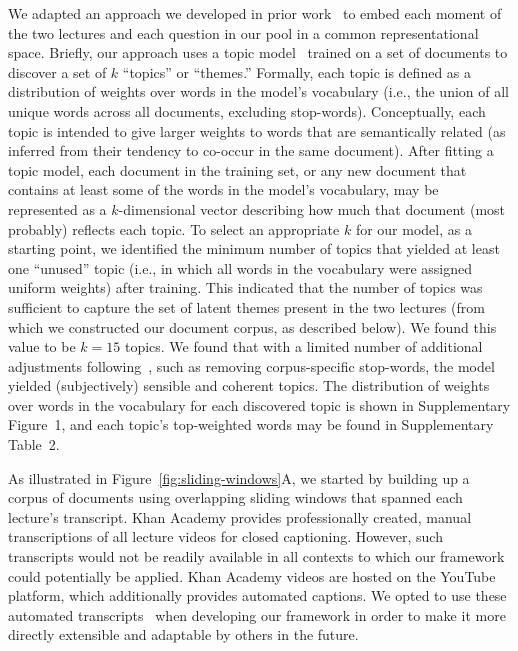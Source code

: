 \documentclass[10pt]{article}
\newcommand{\topics}{2}
\newcommand{\topicWordWeights}{1}
\begin{document}
We adapted an approach we developed in prior work~\citep{HeusEtal21} to embed
each moment of the two lectures and each question in our pool in a common
representational space. Briefly, our approach uses a topic model~\citep[Latent
Dirichlet Allocation; ][]{BleiEtal03} trained on a set of documents to
discover a set of $k$ ``topics'' or ``themes.'' Formally, each topic is
defined as a distribution of weights over words in the model's vocabulary
(i.e., the union of all unique words across all documents, excluding stop-words). 
Conceptually, each topic is intended to give larger weights to words
that are semantically related (as inferred from their tendency to co-occur in
the same document). After fitting a topic model, each document in the training
set, or any new document that contains at least some of the words in
the model's vocabulary, may be represented as a $k$-dimensional vector
describing how much that document (most probably) reflects each topic. To select
an appropriate $k$ for our model, as a starting point, we identified the
minimum number of topics that yielded at least one ``unused'' topic (i.e., in
which all words in the vocabulary were assigned uniform weights) after
training. This indicated that the number of topics was sufficient to capture
the set of latent themes present in the two lectures (from which we constructed
our document corpus, as described below). We found this value to be $k = 15$
topics. We found that with a limited number of additional adjustments
following~\cite{BoydEtal14}, such as removing corpus-specific stop-words, the
model yielded (subjectively) sensible and coherent topics. The distribution of
weights over words in the vocabulary for each discovered topic is shown in
Supplementary Figure~\topicWordWeights, and each topic's top-weighted words may
be found in Supplementary Table~\topics.

As illustrated in Figure~\ref{fig:sliding-windows}A, we started by building up a
corpus of documents using overlapping sliding windows that spanned each lecture's
transcript. Khan Academy provides professionally created, manual transcriptions
of all lecture videos for closed captioning. However, such transcripts would not be
readily available in all contexts to which our framework could potentially be
applied. Khan Academy videos are hosted on the YouTube platform, which
additionally provides automated captions. We opted to use these automated
transcripts~\citep[which, in prior work, we have found to be of sufficiently
near-human quality to yield reliable data in behavioral
studies; ][]{ZimaEtal18} when developing our framework in order to make
it more directly extensible and adaptable by others in the future.
\end{document}
